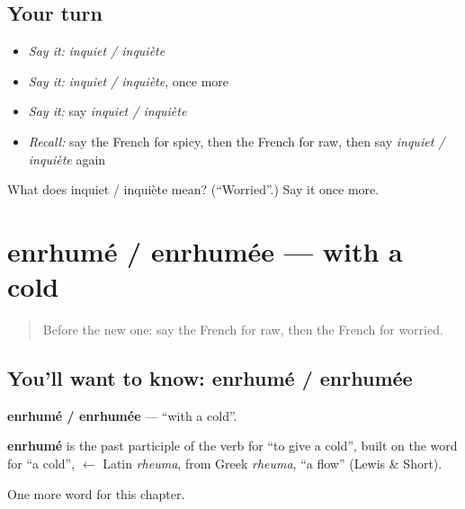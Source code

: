 \subsection*{Your turn}
\begin{itemize}
\raggedright
  \item \emph{Say it:} \emph{inquiet / inquiète}
  \item \emph{Say it:} \emph{inquiet / inquiète}, once more
  \item \emph{Say it:} say \emph{inquiet / inquiète}
  \item \emph{Recall:} say the French for spicy, then the French for raw, then say \emph{inquiet / inquiète} again
\end{itemize}

\begin{tcolorbox}[breakable,colback=teal!4,colframe=teal!35!black,title={Before you move on}]
What does inquiet / inquiète mean? (\textquotedblleft{}Worried\textquotedblright{}.) Say it once more.
\end{tcolorbox}
\section[enrhumé / enrhumée]{enrhumé / enrhumée — with a cold}

\label{lesson:FR-C162-enrhume-enrhumee}



\begin{quote}
Before the new one: say the French for raw, then the French for worried.
\end{quote}

\subsection*{You'll want to know: enrhumé / enrhumée}
\textbf{enrhumé / enrhumée} — \textquotedblleft{}with a cold\textquotedblright{}.

\begin{cousinweb}
\textbf{enrhumé} is the past participle of the verb for \textquotedblleft{}to give a cold\textquotedblright{}, built on the word for \textquotedblleft{}a cold\textquotedblright{}, $\leftarrow$ Latin \emph{rheuma}, from Greek \emph{rheuma}, \textquotedblleft{}a flow\textquotedblright{} (Lewis \& Short).
\end{cousinweb}

\begin{grammarlens}[title={What you've built}]
One more word for this chapter.
\end{grammarlens}

